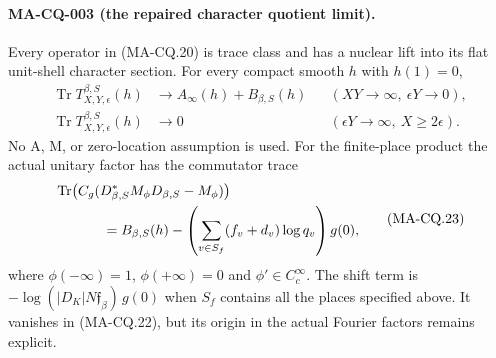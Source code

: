 \paragraph{MA-CQ-003 (the repaired character quotient limit).}
Every operator in (MA-CQ.20) is trace class and has a
nuclear lift into its flat unit-shell character section.
For every compact smooth $h$ with $h(1)=0$,
\[
\begin{aligned}
 \operatorname{Tr}T^{\beta,S}_{X,Y,\epsilon}(h)
       &\longrightarrow A_\infty(h)+B_{\beta,S}(h)
             &&(XY\to\infty,\ \epsilon Y\to0),\\
 \operatorname{Tr}T^{\beta,S}_{X,Y,\epsilon}(h)
       &\longrightarrow0
             &&(\epsilon Y\to\infty,\ X\ge2\epsilon).
\end{aligned}
\tag{MA-CQ.22}
\]
No A, M, or zero-location assumption is used.
For the finite-place product the actual unitary
factor has the commutator trace
\[
\begin{aligned}
 &\operatorname{Tr}\bigl(
       C_g(D_{\beta,S}^*M_\phi D_{\beta,S}-M_\phi)\bigr)\\
 &\hspace{12mm}
   =B_{\beta,S}(h)
       -\left(\sum_{v\in S_f}(f_v+d_v)\log q_v\right)g(0),
\end{aligned}
\tag{MA-CQ.23}
\]
where $\phi(-\infty)=1$, $\phi(+\infty)=0$ and
$\phi'\in C_c^\infty$.
The shift term is
$-\log(|D_K|N\mathfrak f_\beta)\,g(0)$ when $S_f$
contains all the places specified above.
It vanishes in (MA-CQ.22), but its origin in the
actual Fourier factors remains explicit.

